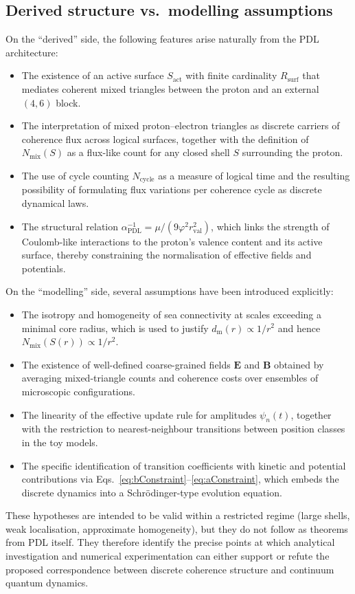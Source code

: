 \documentclass[11pt,a4paper]{article}
\begin{document}
\subsection*{Derived structure vs.\ modelling assumptions}

On the “derived” side, the following features arise naturally from the PDL architecture:
\begin{itemize}
  \item The existence of an active surface $S_{\mathrm{act}}$ with finite cardinality $R_{\mathrm{surf}}$ that mediates coherent mixed triangles between the proton and an external $(4,6)$ block.
  \item The interpretation of mixed proton–electron triangles as discrete carriers of coherence flux across logical surfaces, together with the definition of $N_{\mathrm{mix}}(S)$ as a flux-like count for any closed shell $S$ surrounding the proton.
  \item The use of cycle counting $N_{\mathrm{cycle}}$ as a measure of logical time and the resulting possibility of formulating flux variations per coherence cycle as discrete dynamical laws.\cite{Laubscher2026FullPDL}
  \item The structural relation $\alpha_{\mathrm{PDL}}^{-1} = \mu/(9\varphi^{2} r_{\mathrm{val}}^{2})$, which links the strength of Coulomb-like interactions to the proton’s valence content and its active surface, thereby constraining the normalisation of effective fields and potentials.\cite{Laubscher2026Alpha}
\end{itemize}

On the “modelling” side, several assumptions have been introduced explicitly:
\begin{itemize}
  \item The isotropy and homogeneity of sea connectivity at scales exceeding a minimal core radius, which is used to justify $d_{\mathrm{m}}(r) \propto 1/r^{2}$ and hence $N_{\mathrm{mix}}(S(r)) \propto 1/r^{2}$.\cite{Laubscher2026SchrodingerSketch}
  \item The existence of well-defined coarse-grained fields $\mathbf{E}$ and $\mathbf{B}$ obtained by averaging mixed-triangle counts and coherence costs over ensembles of microscopic configurations.
  \item The linearity of the effective update rule for amplitudes $\psi_{n}(t)$, together with the restriction to nearest-neighbour transitions between position classes in the toy models.
  \item The specific identification of transition coefficients with kinetic and potential contributions via Eqs.~\eqref{eq:bConstraint}–\eqref{eq:aConstraint}, which embeds the discrete dynamics into a Schr\"odinger-type evolution equation.
\end{itemize}
These hypotheses are intended to be valid within a restricted regime (large shells, weak localisation, approximate homogeneity), but they do not follow as theorems from PDL itself.
They therefore identify the precise points at which analytical investigation and numerical experimentation can either support or refute the proposed correspondence between discrete coherence structure and continuum quantum dynamics.
\end{document}
